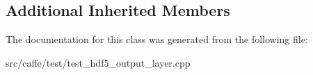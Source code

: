 \subsection*{Additional Inherited Members}


The documentation for this class was generated from the following file\+:\begin{DoxyCompactItemize}
\item 
src/caffe/test/test\+\_\+hdf5\+\_\+output\+\_\+layer.\+cpp\end{DoxyCompactItemize}

